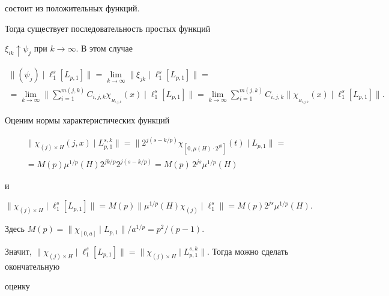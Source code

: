\begin{pf}
состоит из положительных функций.


Тогда существует последовательность простых функций


$\xi_{ik}\uparrow\psi_j $ при $k\rightarrow \infty$. В этом случае


\begin{multline*}


\|(\psi_j) \mid \ell^s_1[L_{p,1}] \| = \lim_{k\rightarrow \infty}\|


\xi_{jk} \mid\ell^s_1[L_{p,1}]\| =\\


%


=\lim_{k\rightarrow \infty }\bigg\| \sum^{m(j,k)}_{i=1}


C_{i,j,k}\chi_{_{H_{i,j,k}}}(x)\mid\ell^s_1[L_{p,1}] \bigg\|=


\lim_{k\rightarrow \infty } \sum^{m(j,k)}_{i=1}


C_{i,j,k}\| \chi_{_{H_{i,j,k}}}(x)\mid\ell^s_1[L_{p,1}] \|.


\end{multline*}


Оценим нормы характеристических функций


\begin{multline*}


\| \chi_{(j)\times H}(j,x)\mid L^{s,k}_{p,1} \| = \| 2^{j(s-k/p)}


\chi_{[0,\mu (H)\cdot 2^{jk}]} (t)\mid L_{p,1}\| = \\


%


=M(p) \mu^{1/p}(H) 2^{jk/p} 2^{j(s-k/p)} =


M(p)\,2^{js}\mu^{1/p}(H)


\end{multline*}


и


$$


\| \chi_{(j)\times H}\mid\ell^s_1[L_{p,1}]\| = M(p)


\|\mu^{1/p}(H) \chi_{(j)} \mid\ell^s_1 \| =


M(p) 2^{js}\mu^{1/p}(H).


$$


Здесь $M(p) =\| \chi_{[0,a]}\mid L_{p,1}\| /a^{1/p} =p^2/(p-1)$.


Значит, $\| \chi_{(j)\times H}\mid\ell^s_1[L_{p,1}]\| =


\|\chi_{(j)\times H}\mid L_{p,1}^{s,k}\|$. Тогда можно сделать окончательную


оценку



\end{pf}
